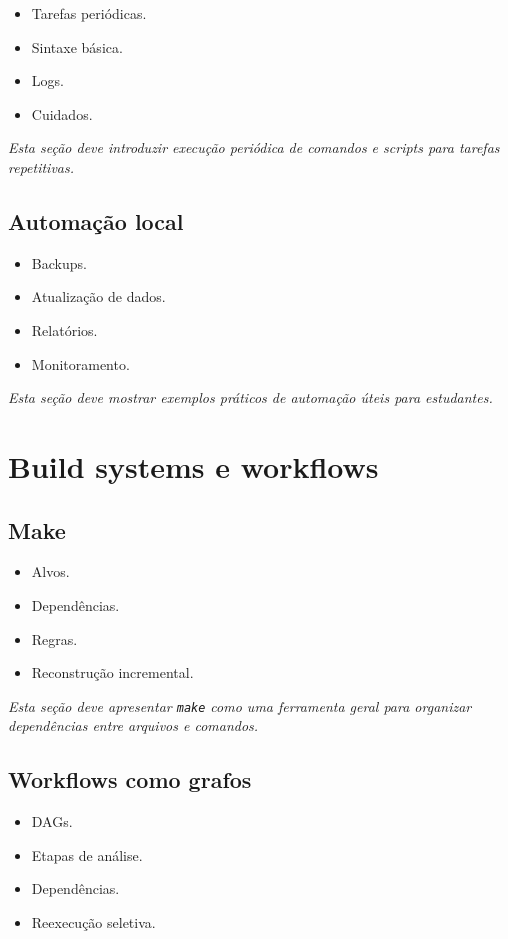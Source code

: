 \documentclass[12pt,openany]{book}
\newcommand{\placeholder}[1]{
    \par\medskip
    \noindent\textit{#1}
    \par\medskip
}
\newcommand{\topicos}[1]{
    \begin{itemize}
        #1
    \end{itemize}
}
\begin{document}
\begin{refsection}
\topicos{
    \item Tarefas periódicas.
    \item Sintaxe básica.
    \item Logs.
    \item Cuidados.
}

\placeholder{Esta seção deve introduzir execução periódica de comandos e scripts para tarefas repetitivas.}

\section{Automação local}

\topicos{
    \item Backups.
    \item Atualização de dados.
    \item Relatórios.
    \item Monitoramento.
}

\placeholder{Esta seção deve mostrar exemplos práticos de automação úteis para estudantes.}

\chapter{Build systems e workflows}

\section{Make}

\topicos{
    \item Alvos.
    \item Dependências.
    \item Regras.
    \item Reconstrução incremental.
}

\placeholder{Esta seção deve apresentar \texttt{make} como uma ferramenta geral para organizar dependências entre arquivos e comandos.}

\section{Workflows como grafos}

\topicos{
    \item DAGs.
    \item Etapas de análise.
    \item Dependências.
    \item Reexecução seletiva.
}


\end{refsection}
\end{document}
